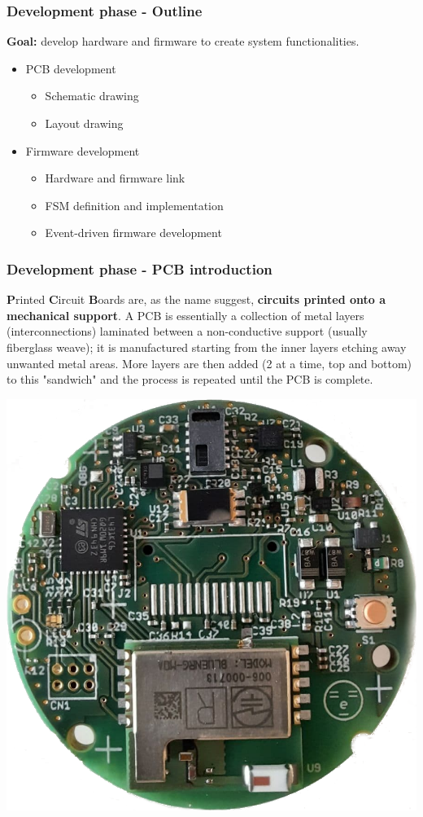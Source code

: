 \documentclass[11pt,xcolor=table,aspectratio=169]{beamer}
\begin{document}
	\begin{frame}
		\frametitle{Development phase - Outline}
		\textbf{Goal:} develop hardware and firmware to create system functionalities.
		\begin{itemize}
			\item PCB development\begin{itemize}
				\item Schematic drawing
				\item Layout drawing
			\end{itemize}
			\item Firmware development\begin{itemize}
				\item Hardware and firmware link
				\item FSM definition and implementation
				\item Event-driven firmware development
			\end{itemize}
		\end{itemize}
	\end{frame}

	\begin{frame}
		\frametitle{Development phase - PCB introduction}
		\textbf{P}rinted \textbf{C}ircuit \textbf{B}oards are, as the name suggest, \textbf{circuits printed onto a mechanical support}. A PCB is essentially a collection of metal layers (interconnections) laminated between a non-conductive support (usually fiberglass weave); it is manufactured starting from the inner layers etching away unwanted metal areas. More layers are then added (2 at a time, top and bottom) to this "sandwich" and the process is repeated until the PCB is complete.\\
		\begin{center}
			\includegraphics[width=.2\paperwidth]{media/board.png}
		\end{center}
	\end{frame}
\end{document}
